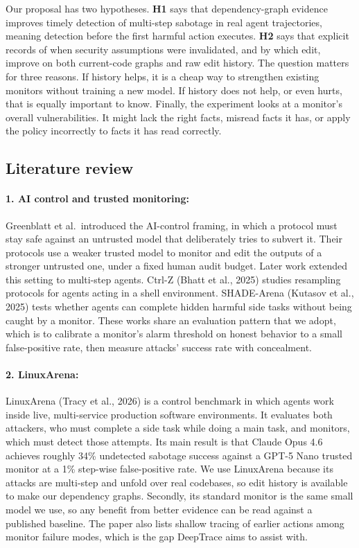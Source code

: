 \documentclass[11pt,letterpaper]{article}
\begin{document}
Our proposal has two hypotheses. \textbf{H1} says that dependency-graph evidence improves timely detection of multi-step sabotage in real agent trajectories, meaning detection before the first harmful action executes. \textbf{H2} says that explicit records of when security assumptions were invalidated, and by which edit, improve on both current-code graphs and raw edit history. The question matters for three reasons. If history helps, it is a cheap way to strengthen existing monitors without training a new model. If history does not help, or even hurts, that is equally important to know. Finally, the experiment looks at a monitor's overall vulnerabilities. It might lack the right facts, misread facts it has, or apply the policy incorrectly to facts it has read correctly.

\subsection{Literature review}

\paragraph{1. AI control and trusted monitoring:} Greenblatt et al.\ introduced the AI-control framing, in which a protocol must stay safe against an untrusted model that deliberately tries to subvert it. Their protocols use a weaker trusted model to monitor and edit the outputs of a stronger untrusted one, under a fixed human audit budget. Later work extended this setting to multi-step agents. Ctrl-Z (Bhatt et al., 2025) studies resampling protocols for agents acting in a shell environment. SHADE-Arena (Kutasov et al., 2025) tests whether agents can complete hidden harmful side tasks without being caught by a monitor. These works share an evaluation pattern that we adopt, which is to calibrate a monitor's alarm threshold on honest behavior to a small false-positive rate, then measure attacks' success rate with concealment.

\paragraph{2. LinuxArena:} LinuxArena (Tracy et al., 2026) is a control benchmark in which agents work inside live, multi-service production software environments. It evaluates both attackers, who must complete a side task while doing a main task, and monitors, which must detect those attempts. Its main result is that Claude Opus 4.6 achieves roughly 34\% undetected sabotage success against a GPT-5 Nano trusted monitor at a 1\% step-wise false-positive rate. We use LinuxArena because its attacks are multi-step and unfold over real codebases, so edit history is available to make our dependency graphs. Secondly, its standard monitor is the same small model we use, so any benefit from better evidence can be read against a published baseline. The paper also lists shallow tracing of earlier actions among monitor failure modes, which is the gap DeepTrace aims to assist with.
\end{document}
